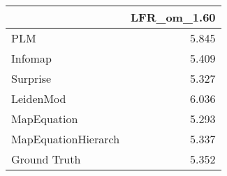 \begin{tabular}{lr}
\toprule
{} & LFR_om_1.60 \\
\midrule
PLM                 &       5.845 \\
Infomap             &       5.409 \\
Surprise            &       5.327 \\
LeidenMod           &       6.036 \\
MapEquation         &       5.293 \\
MapEquationHierarch &       5.337 \\
Ground Truth        &       5.352 \\
\bottomrule
\end{tabular}
